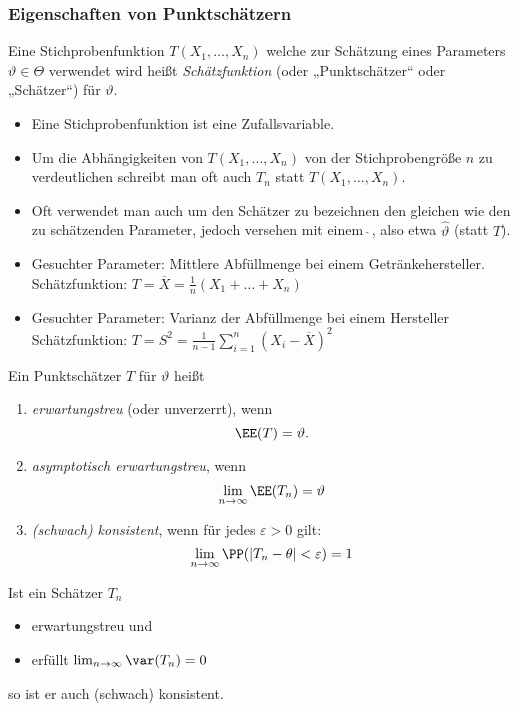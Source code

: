 \documentclass{scrreprt}
\renewenvironment{anumerate}{\begin{enumerate}[label=(\alph*)]}{\end{enumerate}} %
\begin{document}
\subsubsection{Eigenschaften von Punktschätzern}

 Eine Stichprobenfunktion $T(X_1,\ldots, X_n)$ welche zur Schätzung eines Parameters $\vartheta \in \Theta$ verwendet wird heißt \emph{Schätzfunktion} (oder „Punktschätzer“ oder „Schätzer“) für $\vartheta$.

\begin{itemize}
\item Eine Stichprobenfunktion ist eine Zufallsvariable.
\item Um die Abhängigkeiten von $T(X_1,\ldots, X_n)$ von der Stichprobengröße $n$ zu verdeutlichen schreibt man oft auch $T_n$ statt $T(X_1, \ldots, X_n)$.
\item Oft verwendet man auch um den Schätzer zu bezeichnen den gleichen wie den zu schätzenden Parameter, jedoch versehen mit einem $\hat{\;}$, also etwa $\hat{\vartheta}$ (statt $T$).
\end{itemize}

\begin{itemize}
\item Gesuchter Parameter: Mittlere Abfüllmenge bei einem Getränkehersteller.\\
Schätzfunktion: $T=\overline{X}=\frac{1}{n}(X_1+\ldots + X_n)$
\item Gesuchter Parameter: Varianz der Abfüllmenge bei einem Hersteller\\
Schätzfunktion: $T=S^2=\frac{1}{n-1}\sum_{i=1}^n (X_i-\overline{X})^2$
\end{itemize}

Ein Punktschätzer $T$ für $\vartheta$ heißt
\begin{anumerate}
\item \emph{erwartungstreu} (oder unverzerrt), wenn 
$$\EE(T)=\vartheta\text{.}$$
\item \emph{asymptotisch erwartungstreu}, wenn
$$\lim_{n\to \infty} \EE(T_n)=\vartheta$$
\item \emph{(schwach) konsistent}, wenn für jedes $\varepsilon > 0$ gilt:
$$\lim_{n\to \infty}\PP(|T_n-\theta| < \varepsilon) = 1$$
\end{anumerate}

 Ist ein Schätzer $T_n$
\begin{itemize}
\item erwartungstreu und 
\item erfüllt $\lim_{n\to \infty} \var (T_n) = 0$
\end{itemize}
so ist er auch (schwach) konsistent.
\end{document}
